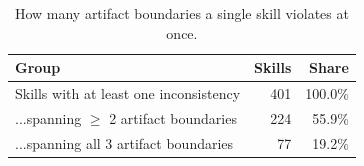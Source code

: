 \begin{table}[t]
  \centering
  \caption{How many artifact boundaries a single skill violates at once.}
  \label{tab:rq1-multiboundary}
  \small
  \setlength{\tabcolsep}{4pt}

  \begin{tabular}{lrr}
    \toprule
    Group & Skills & Share \\
    \midrule
    Skills with at least one inconsistency & 401 & 100.0\% \\
    ...spanning $\geq$ 2 artifact boundaries & 224 & 55.9\% \\
    ...spanning all 3 artifact boundaries & 77 & 19.2\% \\
    \bottomrule
  \end{tabular}
\end{table}

